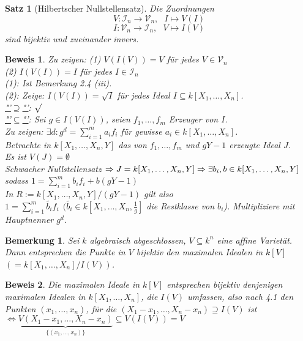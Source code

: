\documentclass[a4paper,12pt]{report}
\theoremstyle{break}
\newtheorem{Satz}{Satz}
\newtheorem{Bem}[Def]{Bemerkung}
\theoremstyle{nonumberbreak}
\theoremstyle{nonumberplain}
\newtheorem{Bew}{Beweis}
\begin{document}
\begin{Satz}[Hilbertscher Nullstellensatz]
\label{satz:HNS}
Die Zuordnungen
$$V: \mathcal{I}_n \rightarrow \mathcal{V}_n,~~~I\mapsto V(I)$$
$$I: \mathcal{V}_n \rightarrow \mathcal{I}_n,~~~V\mapsto I(V)$$
sind bijektiv und zueinander invers.
\end{Satz}
\begin{Bew}
Zu zeigen: (1) $V(I(V))=V$ für jedes $V\in \mathcal{V}_n$\\
(2) $I(V(I))=I$ für jedes $I\in \mathcal{I}_n$\\
(1): Ist Bemerkung 2.4 (iii).\\
(2): Zeige: $I(V(I))= \sqrt{I}$ für jedes Ideal $I\subseteq k[X_1,\dots,X_n]$.\\
\underline{"'$\supseteq$"'}: $\surd$\\
\underline{"'$\subseteq$"'}: Sei $g\in I(V(I))$, seien $f_1,\dots,f_m$ Erzeuger von $I$.\\
Zu zeigen: $\exists d:g^d=\sum_{i=1}^m a_if_i$ für gewisse $a_i\in k[X_1,\dots,X_n]$.\\
Betrachte in $k[X_1,\dots,X_n,Y]$ das von $f_1,\dots,f_m$ und $gY-1$ erzeugte Ideal $J$.\\
Es ist $V(J)=\emptyset$\\
Schwacher Nullstellensatz $\Rightarrow J=k[X_1,\dots,X_n,Y]\\
\Rightarrow \exists b_i,b \in k[X_1,\dots,X_n,Y]$ sodass $1=\sum_{i=1}^m b_if_i + b(gY-1)$\\
In $R:= k[X_1,\dots,X_n,Y]/(gY-1)$ gilt also\\
$1=\sum_{i=1}^m\tilde{b_i}f_i~~ (\tilde{b_i}\in k[X_1,\dots,X_n,\frac{1}{g}]$ die Restklasse von $b_i$). Multipliziere mit Hauptnenner $g^d$.
\end{Bew}
\begin{Bem}
Sei $k$ algebraisch abgeschlossen, $V\subseteq k^n$ eine affine Varietät. Dann entsprechen die Punkte in $V$ bijektiv den maximalen Idealen in $k[V]$ $(=k[X_1,\dots,X_n]/ I(V))$.
\end{Bem}
\begin{Bew}
Die maximalen Ideale in $k[V]$ entsprechen bijektiv denjenigen maximalen Idealen in $k[X_1,\dots,X_n]$, die $I(V)$ umfassen, also nach 4.1 den Punkten $(x_1,\dots,x_n)$, für die $(X_1-x_1,\dots,X_n-x_n)\supseteq I(V)$ ist\\
$\Leftrightarrow \underbrace{V(X_1-x_1,\dots,X_n-x_n)}_{\{(x_1,\dots,x_n)\}}\subseteq V(I(V))= V$
\end{Bew}
\end{document}
